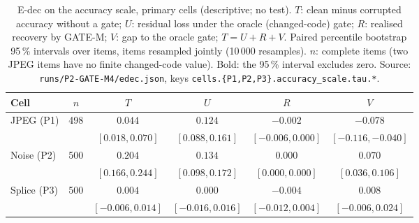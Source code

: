 \begin{table}[!tbp]
\centering
\caption{E-dec on the accuracy scale, primary cells (descriptive; no test). $T$: clean minus corrupted accuracy without a gate; $U$:
residual loss under the oracle (changed-code) gate; $R$: realised recovery by GATE-M; $V$: gap to the oracle gate; $T=U+R+V$.
Paired percentile bootstrap 95\,\% intervals over items, items resampled jointly (10\,000 resamples). $n$: complete items (two JPEG items
have no finite changed-code value). Bold: the 95\,\% interval excludes zero. Source: \nolinkurl{runs/P2-GATE-M4/edec.json}, keys
\nolinkurl{cells.{P1,P2,P3}.accuracy_scale.tau.*}.}
\label{tab:res_edec}
\footnotesize
\begin{adjustbox}{max width=\textwidth}
\begin{tabular}{lccccc}
\toprule
Cell & $n$ & $T$ & $U$ & $R$ & $V$ \\
\midrule
JPEG (P1) & 498 & $\mathbf{0.044}$ & $\mathbf{0.124}$ & $-0.002$ & $\mathbf{-0.078}$ \\
& & \scriptsize$[0.018,0.070]$ & \scriptsize$[0.088,0.161]$ & \scriptsize$[-0.006,0.000]$ & \scriptsize$[-0.116,-0.040]$ \\
Noise (P2) & 500 & $\mathbf{0.204}$ & $\mathbf{0.134}$ & $0.000$ & $\mathbf{0.070}$ \\
& & \scriptsize$[0.166,0.244]$ & \scriptsize$[0.098,0.172]$ & \scriptsize$[0.000,0.000]$ & \scriptsize$[0.036,0.106]$ \\
Splice (P3) & 500 & $0.004$ & $0.000$ & $-0.004$ & $0.008$ \\
& & \scriptsize$[-0.006,0.014]$ & \scriptsize$[-0.016,0.016]$ & \scriptsize$[-0.012,0.004]$ & \scriptsize$[-0.006,0.024]$ \\
\bottomrule
\end{tabular}
\end{adjustbox}
\end{table}

